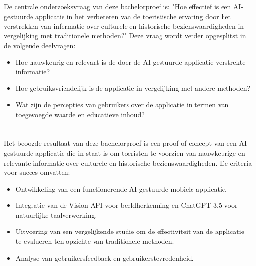 \section{}%
\label{sec:onderzoeksvraag}

De centrale onderzoeksvraag van deze bachelorproef is: "Hoe effectief is een AI-gestuurde applicatie in het verbeteren van de toeristische ervaring door het verstrekken van informatie over culturele en historische bezienswaardigheden in vergelijking met traditionele methoden?" Deze vraag wordt verder opgesplitst in de volgende deelvragen:
\begin{itemize}
    \item Hoe nauwkeurig en relevant is de door de AI-gestuurde applicatie verstrekte informatie?
    \item Hoe gebruiksvriendelijk is de applicatie in vergelijking met andere methoden?
    \item Wat zijn de percepties van gebruikers over de applicatie in termen van toegevoegde waarde en educatieve inhoud?
\end{itemize}

\section{}%
\label{sec:onderzoeksdoelstelling}

Het beoogde resultaat van deze bachelorproef is een proof-of-concept van een AI-gestuurde applicatie die in staat is om toeristen te voorzien van nauwkeurige en relevante informatie over culturele en historische bezienswaardigheden. De criteria voor succes omvatten:
\begin{itemize}
    \item Ontwikkeling van een functionerende AI-gestuurde mobiele applicatie.
    \item Integratie van de Vision API voor beeldherkenning en ChatGPT 3.5 voor natuurlijke taalverwerking.
    \item Uitvoering van een vergelijkende studie om de effectiviteit van de applicatie te evalueren ten opzichte van traditionele methoden.
    \item Analyse van gebruikersfeedback en gebruikerstevredenheid.
\end{itemize}

\section{}%
\label{sec:opzet-bachelorproef}

